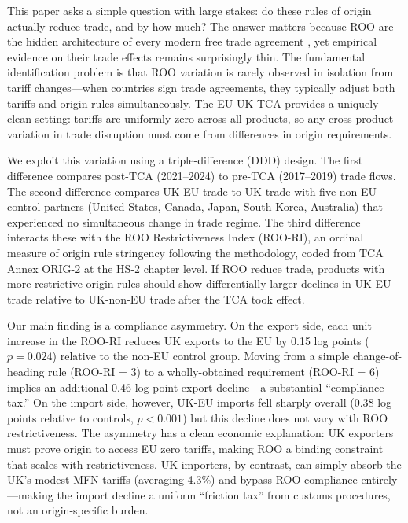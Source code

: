 \documentclass[12pt]{article}
\begin{document}
This paper asks a simple question with large stakes: do these rules of origin actually reduce trade, and by how much? The answer matters because ROO are the hidden architecture of every modern free trade agreement \citep{krishna2006, conconi2018}, yet empirical evidence on their trade effects remains surprisingly thin. The fundamental identification problem is that ROO variation is rarely observed in isolation from tariff changes---when countries sign trade agreements, they typically adjust both tariffs and origin rules simultaneously. The EU-UK TCA provides a uniquely clean setting: tariffs are uniformly zero across all products, so any cross-product variation in trade disruption must come from differences in origin requirements.

We exploit this variation using a triple-difference (DDD) design. The first difference compares post-TCA (2021--2024) to pre-TCA (2017--2019) trade flows. The second difference compares UK-EU trade to UK trade with five non-EU control partners (United States, Canada, Japan, South Korea, Australia) that experienced no simultaneous change in trade regime. The third difference interacts these with the ROO Restrictiveness Index (ROO-RI), an ordinal measure of origin rule stringency following the \citet{estevadeordal2000} methodology, coded from TCA Annex ORIG-2 at the HS-2 chapter level. If ROO reduce trade, products with more restrictive origin rules should show differentially larger declines in UK-EU trade relative to UK-non-EU trade after the TCA took effect.

Our main finding is a compliance asymmetry. On the export side, each unit increase in the ROO-RI reduces UK exports to the EU by 0.15 log points ($p = 0.024$) relative to the non-EU control group. Moving from a simple change-of-heading rule (ROO-RI = 3) to a wholly-obtained requirement (ROO-RI = 6) implies an additional 0.46 log point export decline---a substantial ``compliance tax.'' On the import side, however, UK-EU imports fell sharply overall (0.38 log points relative to controls, $p < 0.001$) but this decline does not vary with ROO restrictiveness. The asymmetry has a clean economic explanation: UK exporters must prove origin to access EU zero tariffs, making ROO a binding constraint that scales with restrictiveness. UK importers, by contrast, can simply absorb the UK's modest MFN tariffs (averaging 4.3\%) and bypass ROO compliance entirely---making the import decline a uniform ``friction tax'' from customs procedures, not an origin-specific burden.
\end{document}
